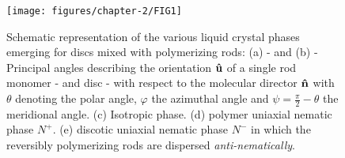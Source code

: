 \begin{figure}
  \texttt{[image: figures/chapter-2/FIG1]}
  \caption[Schematic representation of the various liquid crystal phases emerging for discs mixed with polymerizing rods]{Schematic representation of the various liquid crystal phases emerging for discs mixed with polymerizing rods: (a) - and (b) - Principal angles describing the orientation ${\bf \hat{u}}$ of a single rod monomer - and disc - with respect to the molecular director ${\bf \hat{n}}$  with $\theta$ denoting the polar angle, $\varphi$ the azimuthal angle and $\psi = \frac{\pi}{2} - \theta $ the meridional angle.  (c) Isotropic phase. (d) polymer uniaxial nematic phase $N^+$. (e) discotic uniaxial nematic phase $N^-$ in which the reversibly polymerizing rods are dispersed {\em anti-nematically}.}
  \label{fig:cartoon}
\end{figure}

